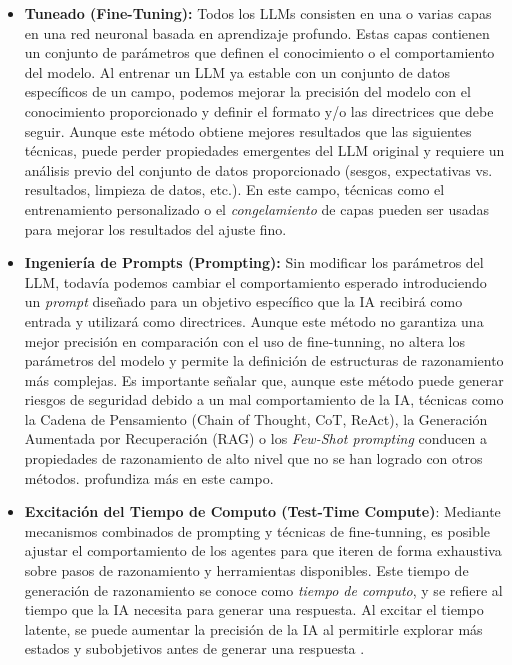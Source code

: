 \begin{itemize} \item \textbf{Tuneado (Fine-Tuning):} Todos los LLMs
    consisten en una o varias capas en una red neuronal basada en aprendizaje
    profundo. Estas capas contienen un conjunto de parámetros que definen el
    conocimiento o el comportamiento del modelo. Al entrenar un LLM ya estable con
    un conjunto de datos específicos de un campo, podemos mejorar la precisión del
    modelo con el conocimiento proporcionado y definir el formato y/o las
    directrices que debe seguir. Aunque este método obtiene mejores resultados
    que las siguientes técnicas, puede perder propiedades emergentes del LLM
    original y requiere un análisis previo del conjunto de datos proporcionado
    (sesgos, expectativas vs. resultados, limpieza de datos, etc.). En este
    campo, técnicas como el entrenamiento personalizado o el
    \textit{congelamiento} de capas pueden ser usadas para mejorar los
    resultados del ajuste fino.

\label{sec:prompting}
\item \textbf{Ingeniería de Prompts (Prompting):} Sin modificar los parámetros del
    LLM, todavía podemos cambiar el comportamiento esperado introduciendo un
    \textit{prompt} diseñado para un objetivo específico que la IA recibirá como
    entrada y utilizará como directrices. Aunque este método no garantiza una mejor
    precisión en comparación con el uso de fine-tunning, no altera los parámetros del modelo
    y permite la definición de estructuras de razonamiento más complejas. Es importante
    señalar que, aunque este método puede generar riesgos de seguridad debido a un
    mal comportamiento de la IA, técnicas como la Cadena de Pensamiento (Chain of
    Thought, CoT, ReAct), la Generación Aumentada por Recuperación (RAG) o los
    \textit{Few-Shot prompting} conducen a propiedades de razonamiento de alto nivel
    que no se han logrado con otros métodos. \cite{sahoo2024systematic}
    profundiza más en este campo.

\item \textbf{Excitación del Tiempo de Computo (Test-Time Compute)}: Mediante 
    mecanismos combinados de prompting y técnicas de fine-tunning, es posible
    ajustar el comportamiento de los agentes para que iteren de forma exhaustiva
    sobre pasos de razonamiento y herramientas disponibles. Este tiempo de
    generación de razonamiento se conoce como \emph{tiempo de computo}, y se
    refiere al tiempo que la IA necesita para generar una respuesta. Al excitar
    el tiempo latente, se puede aumentar la precisión de la IA al permitirle
    explorar más estados y subobjetivos antes de generar una respuesta
    \cite{norris1978computer}.


\end{itemize}
